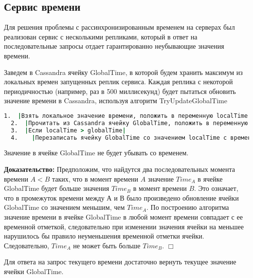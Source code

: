 \subsection{Сервис времени}

Для решения проблемы с рассинхронизированным временем на серверах был реализован сервис с несколькими репликами, который в ответ на последовательные запросы отдает гарантированно неубывающие значения времени.

Заведем в Cassandra ячейку GlobalTime, в которой будем хранить максимум из локальных времен запущенных реплик сервиса. Каждая реплика с некоторой периодичностью (например, раз в 500 миллисекунд) будет пытаться обновить значение времени в Cassandra, используя алгоритм TryUpdateGlobalTime

\begin{lstlisting}[language=csh,caption={Алгоритм TryUpdateGlobalTime}]
  1.  |Взять локальное значение времени, положить в переменную localTime|
  2.  |Прочитать из Cassandra ячейку GlobalTime, положить в переменную globalTime|
  3.  |Если localTime > globalTime|
  4.  	|Перезаписать ячейку GlobalTime со значением localTime с временной отметкой localTime|
\end{lstlisting}

\begin{theorem}
Значение в ячейке GlobalTime не будет убывать со временем.
\end{theorem}
\textbf{Доказательство:}
Предположим, что найдутся два последовательных момента времени $A < B$ таких, что в момент времени $A$ значение $Time_A$ в ячейке GlobalTime будет больше значения $Time_B$ в момент времени $B$. Это означает, что в промежуток времени между $А$ и $В$ было произведено обновление ячейки GlobalTime со значением меньшим, чем $Time_A$. По построению алгоритма значение времени в ячейке GlobalTime в любой момент времени совпадает с ее временной отметкой, следовательно при изменении значения ячейки на меньшее нарушилось бы правило неуменьшения временной отметки ячейки. Следовательно, $Time_A$ не может быть больше $Time_B$.
$\Box$

Для ответа на запрос текущего времени достаточно вернуть текущее значение ячейки GlobalTime.